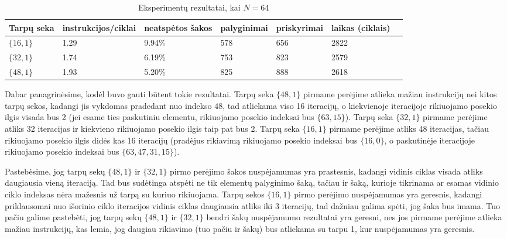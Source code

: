 \documentclass{VUMIFInfBakalaurinis}
\begin{document}
\begin{table}[H]
  \caption{Eksperimentų rezultatai, kai $N = 64$}
  \label{perf_results2_64}
  \centering
  \begin{tabular}{@{}lllllll@{}}
  Tarpų seka             & instrukcijos/ciklai     & neatspėtos šakos  & palyginimai       & priskyrimai      & laikas (ciklais) \\ \midrule
  $\{16, 1\}$            & 1.29                    & 9.94\%            & 578               & 656              & 2822                  \\
  $\{32, 1\}$            & 1.74                    & 6.19\%            & 753               & 823              & 2579                  \\
  $\{48, 1\}$            & 1.93                    & 5.20\%            & 825               & 888              & 2618                  \\ \bottomrule
  \end{tabular}
\end{table}

Dabar panagrinėsime, kodėl buvo gauti būtent tokie rezultatai.
Tarpų seka $\{48, 1\}$ pirmame perėjime atlieka mažiau instrukcijų nei kitos tarpų sekos, kadangi jis vykdomas pradedant nuo indekso $48$,
tad atliekama viso 16 iteracijų, o kiekvienoje iteracijoje rikiuojamo posekio ilgis visada bus 2 (jei esame ties paskutiniu elementu, rikiuojamo posekio indeksai bus $\{63, 15\}$).
Tarpų seka $\{32, 1\}$ pirmame perėjime atliks 32 iteracijas ir kiekvieno rikiuojamo posekio ilgis taip pat bus 2.
Tarpų seka $\{16, 1\}$ pirmame perėjime atliks 48 iteracijas, tačiau rikiuojamo posekio ilgis didės kas 16 iteracijų (pradėjus rikiavimą
rikiuojamo posekio indeksai bus $\{16, 0\}$, o paskutinėje iteracijoje rikiuojamo posekio indeksai bus $\{63, 47, 31, 15\}$).

Pastebėsime, jog tarpų sekų $\{48, 1\}$ ir $\{32, 1\}$ pirmo perėjimo šakos nuspėjamumas yra prastesnis, kadangi
vidinis ciklas visada atliks daugiausia vieną iteraciją.
Tad bus sudėtinga atspėti ne tik elementų palyginimo šaką, tačiau ir šaką, kurioje tikrinama ar esamas vidinio ciklo indeksas nėra mažesnis už tarpą su kuriuo rikiuojama.
Tarpų sekos $\{16, 1\}$ pirmo perėjimo nuspėjamumas yra geresnis, kadangi priklausomai nuo išorinio ciklo iteracijos vidinis ciklas daugiausia atliks iki 3 iteracijų, tad dažniau galima spėti, jog šaka bus imama.
Tuo pačiu galime pastebėti, jog tarpų sekų $\{48, 1\}$ ir $\{32, 1\}$ bendri šakų nuspėjamumo rezultatai yra geresni, nes jos pirmame perėjime
atlieka mažiau instrukcijų, kas lemia, jog daugiau rikiavimo (tuo pačiu ir šakų) bus atliekama su tarpu 1, kur nuspėjamumas yra geresnis.
\end{document}
